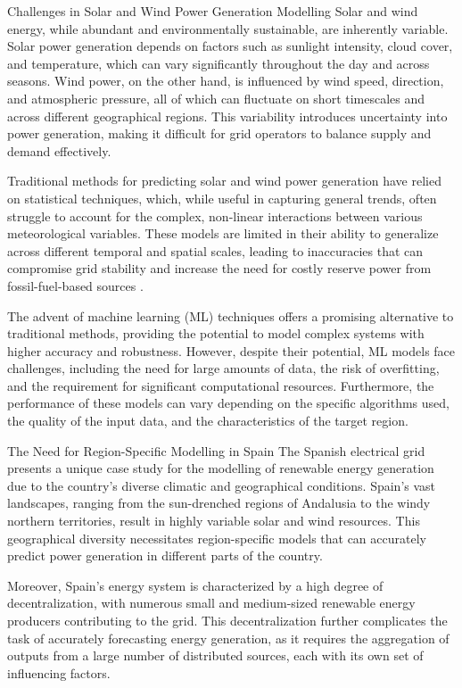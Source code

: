 Challenges in Solar and Wind Power Generation Modelling
Solar and wind energy, while abundant and environmentally sustainable, are inherently variable. Solar power generation depends on factors such as sunlight intensity, cloud cover, and temperature, which can vary significantly throughout the day and across seasons. Wind power, on the other hand, is influenced by wind speed, direction, and atmospheric pressure, all of which can fluctuate on short timescales and across different geographical regions. This variability introduces uncertainty into power generation, making it difficult for grid operators to balance supply and demand effectively.

Traditional methods for predicting solar and wind power generation have relied on statistical techniques, which, while useful in capturing general trends, often struggle to account for the complex, non-linear interactions between various meteorological variables. These models are limited in their ability to generalize across different temporal and spatial scales, leading to inaccuracies that can compromise grid stability and increase the need for costly reserve power from fossil-fuel-based sources .

The advent of machine learning (ML) techniques offers a promising alternative to traditional methods, providing the potential to model complex systems with higher accuracy and robustness. However, despite their potential, ML models face challenges, including the need for large amounts of data, the risk of overfitting, and the requirement for significant computational resources. Furthermore, the performance of these models can vary depending on the specific algorithms used, the quality of the input data, and the characteristics of the target region.

The Need for Region-Specific Modelling in Spain
The Spanish electrical grid presents a unique case study for the modelling of renewable energy generation due to the country’s diverse climatic and geographical conditions. Spain's vast landscapes, ranging from the sun-drenched regions of Andalusia to the windy northern territories, result in highly variable solar and wind resources. This geographical diversity necessitates region-specific models that can accurately predict power generation in different parts of the country.

Moreover, Spain's energy system is characterized by a high degree of decentralization, with numerous small and medium-sized renewable energy producers contributing to the grid. This decentralization further complicates the task of accurately forecasting energy generation, as it requires the aggregation of outputs from a large number of distributed sources, each with its own set of influencing factors.


